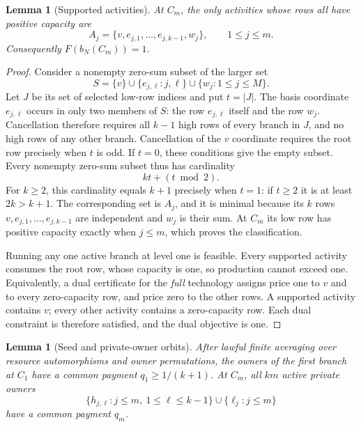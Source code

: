 \documentclass[11pt]{article}
\newtheorem{lemma}[theorem]{Lemma}
\theoremstyle{definition}\newtheorem{definition}[theorem]{Definition}
\theoremstyle{remark}\newtheorem{remark}[theorem]{Remark}
\begin{document}
\begin{lemma}[Supported activities]
\label{arity:supported}
At $C_m$, the only activities whose rows all have positive capacity are
\[
  A_j=\{v,e_{j,1},\ldots,e_{j,k-1},w_j\},
  \qquad 1\leq j\leq m.
\]
Consequently $F(b_N(C_m))=1$.
\end{lemma}

\begin{proof}
Consider a nonempty zero-sum subset of the larger set
\[
  S=\{v\}\cup\{e_{j,\ell}:j,\ell\}\cup\{w_j:1\leq j\leq M\}.
\]
Let $J$ be its set of selected low-row indices and put $t=|J|$.  The basis
coordinate $e_{j,\ell}$ occurs in only two members of $S$: the row
$e_{j,\ell}$ itself and the row $w_j$.  Cancellation therefore requires all
$k-1$ high rows of every branch in $J$, and no high rows of any other branch.
Cancellation of the $v$ coordinate requires the root row precisely when $t$
is odd.  If $t=0$, these conditions give the empty subset.  Every nonempty
zero-sum subset thus has cardinality
\begin{equation}
  kt+(t\bmod 2).
  \label{arity:dependency-cardinality}
\end{equation}
For $k\geq2$, this cardinality equals $k+1$ precisely when $t=1$: if $t\geq2$
it is at least $2k>k+1$.  The corresponding set is $A_j$, and it is minimal
because its $k$ rows $v,e_{j,1},\ldots,e_{j,k-1}$ are independent and $w_j$
is their sum.  At $C_m$ its low row has positive capacity exactly when
$j\leq m$, which proves the classification.

Running any one active branch at level one is feasible.  Every supported
activity consumes the root row, whose capacity is one, so production cannot
exceed one.  Equivalently, a dual certificate for the \emph{full} technology
assigns price one to $v$ and to every zero-capacity row, and price zero to
the other rows.  A supported activity contains $v$; every other activity
contains a zero-capacity row.  Each dual constraint is therefore satisfied,
and the dual objective is one.
\end{proof}

\begin{lemma}[Seed and private-owner orbits]
\label{arity:orbits}
After lawful finite averaging over resource automorphisms and owner
permutations, the owners of the first branch at $C_1$ have a common payment
$q_1\geq1/(k+1)$.  At $C_m$, all $km$ active private owners
\[
  \{h_{j,\ell}:j\leq m,\ 1\leq\ell\leq k-1\}
  \cup\{\ell_j:j\leq m\}
\]
have a common payment $q_m$.
\end{lemma}
\end{document}
